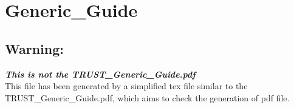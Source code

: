 \documentclass[a4paper,11pt,english]{report}
\begin{document}
\chapter{Generic\_Guide}
\section{Warning:}
\textit{\textbf{This is not the TRUST\_Generic\_Guide.pdf}} \\
This file has been generated by a simplified tex file similar to the TRUST\_Generic\_Guide.pdf, which aims to check the generation of pdf file.
\end{document}
